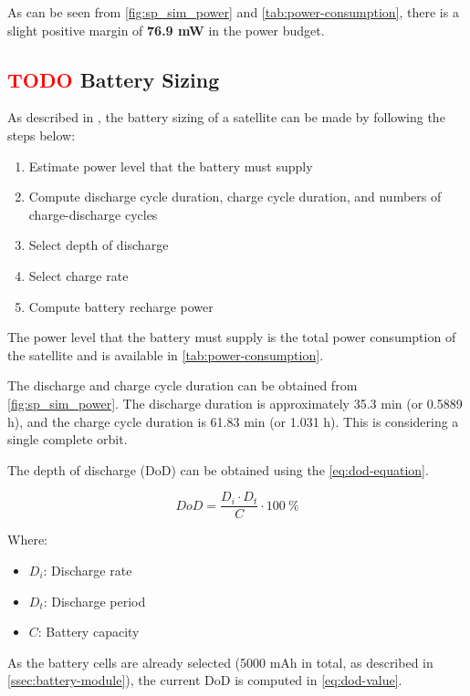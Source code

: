 As can be seen from \autoref{fig:sp_sim_power} and \autoref{tab:power-consumption}, there is a slight positive margin of \textbf{76.9 mW} in the power budget.

\subsection{ \textcolor{red}{TODO} Battery Sizing}

As described in \cite{larson2005}, the battery sizing of a satellite can be made by following the steps below:

\begin{enumerate}
    \item Estimate power level that the battery must supply
    \item Compute discharge cycle duration, charge cycle duration, and numbers of charge-discharge cycles
    \item Select depth of discharge
    \item Select charge rate
    \item Compute battery recharge power
\end{enumerate}

The power level that the battery must supply is the total power consumption of the satellite and is available in \autoref{tab:power-consumption}.

The discharge and charge cycle duration can be obtained from \autoref{fig:sp_sim_power}. The discharge duration is approximately 35.3 min (or 0.5889 h), and the charge cycle duration is 61.83 min (or 1.031 h). This is considering a single complete orbit.

The depth of discharge (DoD) can be obtained using the \autoref{eq:dod-equation}.

\begin{equation} \label{eq:dod-equation}
    DoD = \frac{D_{i} \cdot D_{t}}{C} \cdot 100\ \%
\end{equation}

Where:

\begin{itemize}
    \item $D_{i}$: Discharge rate
    \item $D_{t}$: Discharge period
    \item $C$: Battery capacity
\end{itemize}

As the battery cells are already selected (5000 mAh in total, as described in \autoref{ssec:battery-module}), the current DoD is computed in \autoref{eq:dod-value}.

